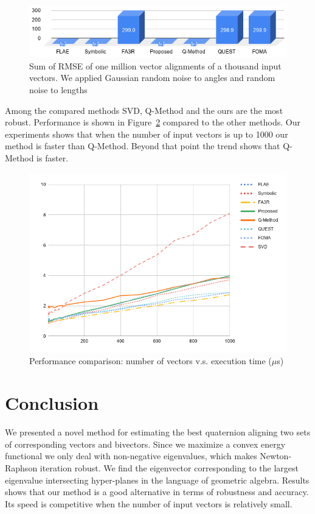 \documentclass{birkjour}
\numberwithin{equation}{section}
\begin{document}
\begin{figure}[H]
\centering
\includegraphics[width=1.0\textwidth]{robustness.png}
\caption{Sum of RMSE of one million vector alignments of a thousand input vectors. We applied Gaussian random noise to angles and random noise to lengths}
\label{fig:robustness}
\end{figure}

Among the compared methods SVD, Q-Method and the ours are the most robust. Performance is shown in Figure~\ref{fig:time} compared to the other methods. Our experiments shows that when the number of input vectors is up to 1000 our method is faster than Q-Method. Beyond that point the trend shows that Q-Method is faster.

\begin{figure}[H]
	\centering
	\includegraphics[width=1.0\textwidth]{time.png}
	\caption{Performance comparison: number of vectors v.s. execution time ($\mu$s)}
	\label{fig:time}
\end{figure}

\section{Conclusion}

We presented a novel method for estimating the best quaternion aligning two sets of corresponding vectors and bivectors. Since we maximize a convex energy functional we only deal with non-negative eigenvalues, which makes Newton-Raphson iteration robust. We find the eigenvector corresponding to the largest eigenvalue intersecting hyper-planes in the language of geometric algebra. Results shows that our method is a good alternative in terms of robustness and accuracy. Its speed is competitive when the number of input vectors is relatively small. 
\end{document}
